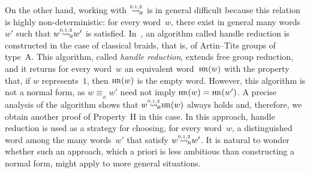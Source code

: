 \documentclass{amsart}
\numberwithin{equation}{section}
\theoremstyle{plain}
\theoremstyle{definition}
\begin{document}
On the other hand, working with ${\mathrel{{\mathrel{\overset{\scriptscriptstyle 0,1,2}{\rightsquigarrow}}}_{\hspace{-0.9ex}{\scriptscriptstyle R}}}}$ is in general difficult because this relation is highly non-deterministic: for every word~${w}$, there exist in general many words~${w}'$ such that ${w} {\mathrel{{\mathrel{\overset{\scriptscriptstyle 0,1,2}{\rightsquigarrow}}}_{\hspace{-0.9ex}{\scriptscriptstyle R}}}} {w}'$ is satisfied. In~\cite{Dfo}, an algorithm called handle reduction is constructed in the case of classical braids, that is, of Artin--Tits groups of type~A. This algorithm, called \emph{handle reduction}, extends free group reduction, and it returns for every word~${w}$ an equivalent word~${{\scriptstyle\mathrm{H\hspace{-0.1ex}R}}({w})}$ with the property that, if ${w}$ represents~$1$, then ${{\scriptstyle\mathrm{H\hspace{-0.1ex}R}}({w})}$ is the empty word. However, this algorithm is not a normal form, as ${w} {\equiv_{{\!{}_{R}}}} {w}'$ need not imply ${{\scriptstyle\mathrm{H\hspace{-0.1ex}R}}({w})} = {{\scriptstyle\mathrm{H\hspace{-0.1ex}R}}({{w}'})}$. A precise analysis of the algorithm shows that ${w} {\mathrel{{\mathrel{\overset{\scriptscriptstyle 0,1,2}{\rightsquigarrow}}}_{\hspace{-0.9ex}{\scriptscriptstyle R}}}} {{\scriptstyle\mathrm{H\hspace{-0.1ex}R}}({w})}$ always holds and, therefore, we obtain another proof of Property~${\mathrm{H}}$ in this case. In this approach, handle reduction is used as a strategy for choosing, for every word~${w}$, a distinguished word among the many words~${w}'$ that satisfy ${w} {\mathrel{{\mathrel{\overset{\scriptscriptstyle 0,1,2}{\rightsquigarrow}}}_{\hspace{-0.9ex}{\scriptscriptstyle R}}}} {w}'$. It is natural to wonder whether such an approach, which a priori is less ambitious than constructing a normal form, might apply to more general situations. 
\end{document}
